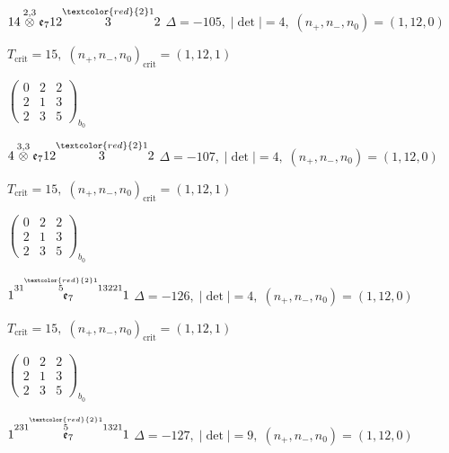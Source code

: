\documentclass[10pt]{article}
\begin{document}
\smallskip

$14\overset{2,3}{\otimes}\mathfrak{e}_712\overset{\textcolor{red}{2}1}{3}2$ \quad $\Delta=-105,\; |\det|=4,\; (n_+,n_-,n_0)=(1,12,0)$

\hspace{1em}$T_{\text{crit}}=15,\; (n_+,n_-,n_0)_{\text{crit}}=(1,12,1)$

\hspace{2em}$\left(\begin{smallmatrix}0 & 2 & 2 \\ 2 & 1 & 3 \\ 2 & 3 & 5\end{smallmatrix}\right)_{\!b_0}$

\smallskip

$4\overset{3,3}{\otimes}\mathfrak{e}_712\overset{\textcolor{red}{2}1}{3}2$ \quad $\Delta=-107,\; |\det|=4,\; (n_+,n_-,n_0)=(1,12,0)$

\hspace{1em}$T_{\text{crit}}=15,\; (n_+,n_-,n_0)_{\text{crit}}=(1,12,1)$

\hspace{2em}$\left(\begin{smallmatrix}0 & 2 & 2 \\ 2 & 1 & 3 \\ 2 & 3 & 5\end{smallmatrix}\right)_{\!b_0}$

\smallskip

$1\overset{31\overset{\textcolor{red}{2}1}{5}13221}{\mathfrak{e}_7}1$ \quad $\Delta=-126,\; |\det|=4,\; (n_+,n_-,n_0)=(1,12,0)$

\hspace{1em}$T_{\text{crit}}=15,\; (n_+,n_-,n_0)_{\text{crit}}=(1,12,1)$

\hspace{2em}$\left(\begin{smallmatrix}0 & 2 & 2 \\ 2 & 1 & 3 \\ 2 & 3 & 5\end{smallmatrix}\right)_{\!b_0}$

\smallskip

$1\overset{231\overset{\textcolor{red}{2}1}{5}1321}{\mathfrak{e}_7}1$ \quad $\Delta=-127,\; |\det|=9,\; (n_+,n_-,n_0)=(1,12,0)$
\end{document}
